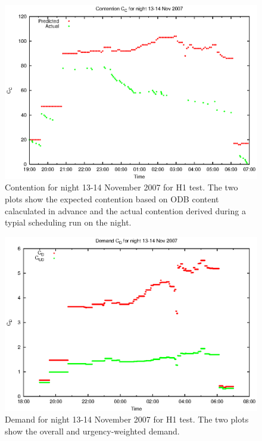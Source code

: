 \begin{figure}[htbp]
\begin{center}
    \includegraphics[scale=1.0, angle=0]{figures/mam/cont.eps}
\end{center}
\caption[Contention for night 13-14 November 2007.]
{Contention for night 13-14 November 2007 for H1 test. The two plots show the expected contention based on ODB content calaculated in advance and the actual contention derived during a typial scheduling run on the night.}
\label{fig:mam_h1_contention}
\end{figure}

\begin{figure}[htbp]
\begin{center}
    \includegraphics[scale=1.0, angle=0]{figures/mam/dmd.eps}
\end{center}
\caption[Demand for night 13-14 November 2007.]
{Demand for night 13-14 November 2007 for H1 test. The two plots show the overall and urgency-weighted demand.}
\label{fig:mam_h1_dmd}
\end{figure}

